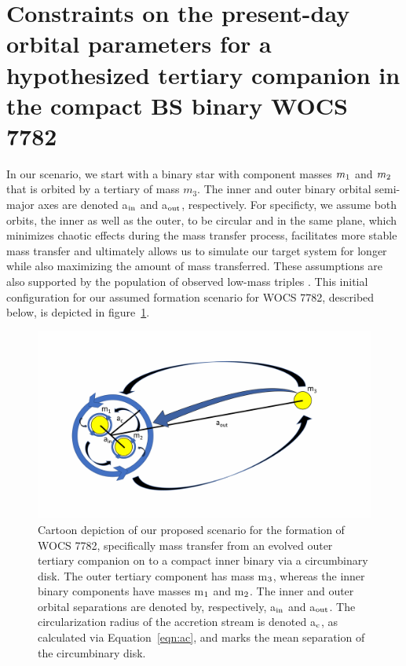 \documentclass[twocolumn]{aastex62}
\begin{document}
\section{Constraints on the present-day orbital parameters for a hypothesized
         tertiary companion in the compact BS binary WOCS 7782} \label{sect:dyn}

In our scenario, we start with a binary star with component masses
$m_{\rm 1}$ and $m_{\rm 2}$ that is orbited by a tertiary of mass
$m_3$. The inner and outer binary orbital semi-major axes are denoted
a$_{\rm in}$ and a$_{\rm out}$, respectively.  For specificty, we
assume both orbits, the inner as well as the outer, to be circular and
in the same plane, which minimizes chaotic effects during the mass
transfer process, facilitates more stable mass transfer and ultimately
allows us to simulate our target system for longer while also
maximizing the amount of mass transferred.  These assumptions are also
supported by the population of observed low-mass triples
\citep{2010yCat..73890925T,2018ApJ...854...44M}.  This initial
configuration for our assumed formation scenario for WOCS 7782,
described below, is depicted in figure~\ref{fig:fig1}.

\begin{figure}[ht!]
\includegraphics[width=\columnwidth]{fig_doodle.pdf}
\caption{Cartoon depiction of our proposed scenario for the formation
  of WOCS 7782, specifically mass transfer from an evolved outer
  tertiary companion on to a compact inner binary via a circumbinary
  disk.  The outer tertiary component has mass m$_{\rm 3}$, whereas
  the inner binary components have masses m$_{\rm 1}$ and m$_{\rm 2}$.
  The inner and outer orbital separations are denoted by,
  respectively, a$_{\rm in}$ and a$_{\rm out}$.  The circularization
  radius of the accretion stream is denoted a$_{\rm c}$, as calculated
  via Equation~\ref{eqn:ac}, and marks the mean separation of the
  circumbinary disk.
\label{fig:fig1}}
\end{figure}
\end{document}
